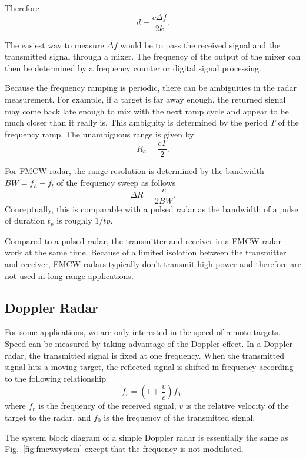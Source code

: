 \documentclass[letterpaper, 11pt]{article}
\newcommand{\due}[1]{\href{https://github.com/ucdart/UCD-EEC134/blob/master/support/schedule/eec134-schedule.pdf}{\textcolor{red}{#1}}}
\begin{document}
Therefore
\[
d = \frac{c\Delta f}{2k}.
\]

The easiest way to measure $\Delta f$ would be to pass the received signal and the transmitted signal through a mixer. The frequency of the output of the mixer can then be determined by a frequency counter or digital signal processing. 

Because the frequency ramping is periodic, there can be ambiguities in the radar measurement. For example, if a target is far away enough, the returned signal may come back late enough to mix with the next ramp cycle and appear to be much closer than it really is. This ambiguity is determined by the period $T$ of the frequency ramp. The unambiguous range is given by 
\[
R_a = \frac{cT}{2}. 
\]

For FMCW radar, the range resolution is determined by the bandwidth $BW = f_h - f_l$ of the frequency sweep as follows
\[
\Delta R = \frac{c}{2BW}. 
\]
Conceptually, this is comparable with a pulsed radar as the bandwidth of a pulse of duration $t_p$ is roughly $1/tp$. 

Compared to a pulsed radar, the transmitter and receiver in a FMCW radar work at the same time. Because of a limited isolation between the transmitter and receiver, FMCW radars typically don't transmit high power and therefore are not used in long-range applications.

\subsection{Doppler Radar}

For some applications, we are only interested in the speed of remote targets. Speed can be measured by taking advantage of the Doppler effect. In a Doppler radar, the transmitted signal is fixed at one frequency. When the transmitted signal hits a moving target, the reflected signal is shifted in frequency according to the following relationship 
\[
f_r = \left( 1+\frac{v}{c} \right) f_0,
\] 
where $f_r$ is the frequency of the received signal, $v$ is the relative velocity of the target to the radar, and $f_0$ is the frequency of the transmitted signal. 

The system block diagram of a simple Doppler radar is essentially the same as Fig.~\ref{fig:fmcwsystem} except that the frequency is not modulated. 

\vspace{3ex}

%
%
\end{document}

